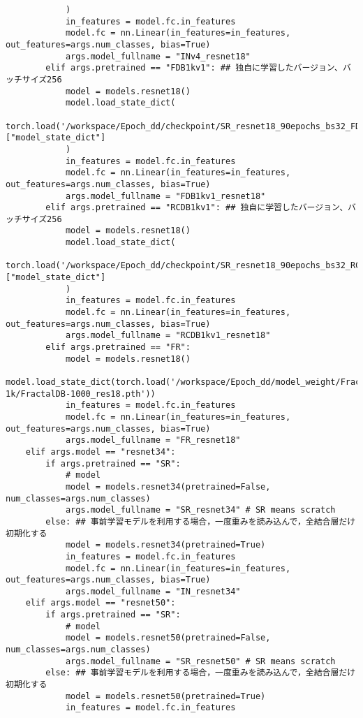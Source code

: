 {\begin{verbatim}
            )
            in_features = model.fc.in_features
            model.fc = nn.Linear(in_features=in_features, out_features=args.num_classes, bias=True)
            args.model_fullname = "INv4_resnet18"
        elif args.pretrained == "FDB1kv1": ## 独自に学習したバージョン、バッチサイズ256
            model = models.resnet18()
            model.load_state_dict(
            torch.load('/workspace/Epoch_dd/checkpoint/SR_resnet18_90epochs_bs32_FDB_1k_ln0pc.tar')["model_state_dict"]
            )
            in_features = model.fc.in_features
            model.fc = nn.Linear(in_features=in_features, out_features=args.num_classes, bias=True)
            args.model_fullname = "FDB1kv1_resnet18"
        elif args.pretrained == "RCDB1kv1": ## 独自に学習したバージョン、バッチサイズ256
            model = models.resnet18()
            model.load_state_dict(
            torch.load('/workspace/Epoch_dd/checkpoint/SR_resnet18_90epochs_bs32_RCDB1k_ln0pc.tar')["model_state_dict"]
            )
            in_features = model.fc.in_features
            model.fc = nn.Linear(in_features=in_features, out_features=args.num_classes, bias=True)
            args.model_fullname = "RCDB1kv1_resnet18"
        elif args.pretrained == "FR":
            model = models.resnet18()
            model.load_state_dict(torch.load('/workspace/Epoch_dd/model_weight/Fractal-1k/FractalDB-1000_res18.pth'))
            in_features = model.fc.in_features
            model.fc = nn.Linear(in_features=in_features, out_features=args.num_classes, bias=True)
            args.model_fullname = "FR_resnet18"
    elif args.model == "resnet34":
        if args.pretrained == "SR":
            # model
            model = models.resnet34(pretrained=False, num_classes=args.num_classes)
            args.model_fullname = "SR_resnet34" # SR means scratch
        else: ## 事前学習モデルを利用する場合，一度重みを読み込んで，全結合層だけ初期化する
            model = models.resnet34(pretrained=True)
            in_features = model.fc.in_features
            model.fc = nn.Linear(in_features=in_features, out_features=args.num_classes, bias=True)
            args.model_fullname = "IN_resnet34"
    elif args.model == "resnet50":
        if args.pretrained == "SR":
            # model
            model = models.resnet50(pretrained=False, num_classes=args.num_classes)
            args.model_fullname = "SR_resnet50" # SR means scratch
        else: ## 事前学習モデルを利用する場合，一度重みを読み込んで，全結合層だけ初期化する
            model = models.resnet50(pretrained=True)
            in_features = model.fc.in_features

\end{verbatim}}
